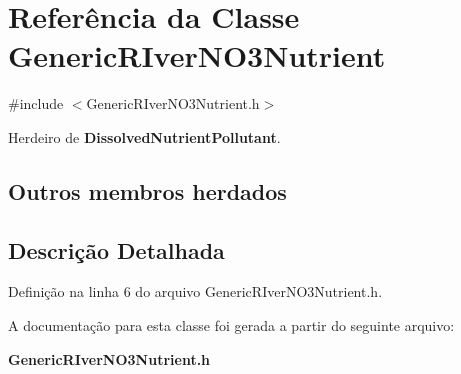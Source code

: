 \section{Referência da Classe Generic\+R\+Iver\+N\+O3\+Nutrient}
\label{class_generic_r_iver_n_o3_nutrient}


{\ttfamily \#include $<$Generic\+R\+Iver\+N\+O3\+Nutrient.\+h$>$}



Herdeiro de {\bf Dissolved\+Nutrient\+Pollutant}.

\subsection*{Outros membros herdados}


\subsection{Descrição Detalhada}


Definição na linha 6 do arquivo Generic\+R\+Iver\+N\+O3\+Nutrient.\+h.



A documentação para esta classe foi gerada a partir do seguinte arquivo\+:\begin{DoxyCompactItemize}
\item 
{\bf Generic\+R\+Iver\+N\+O3\+Nutrient.\+h}\end{DoxyCompactItemize}
